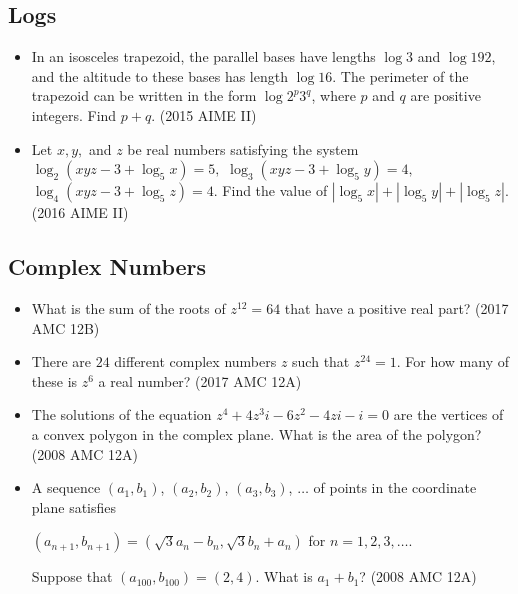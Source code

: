 \documentclass{article}
\begin{document}
\subsection{Logs}

\begin{itemize}

\item In an isosceles trapezoid, the parallel bases have lengths $\log 3$ and $\log 192$, and the altitude to these bases has length $\log 16$. The perimeter of the trapezoid can be written in the form $\log 2^p3^q$, where $p$ and $q$ are positive integers. Find $p+q$. (2015 AIME II)

\item Let $x,y,$ and $z$ be real numbers satisfying the system
$\log_2(xyz-3+\log_5 x)=5,$
$\log_3(xyz-3+\log_5 y)=4,$
$\log_4(xyz-3+\log_5 z)=4.$
Find the value of $|\log_5 x|+|\log_5 y|+|\log_5 z|$. (2016 AIME II)

\end{itemize}

\subsection{Complex Numbers}

\begin{itemize}

\item What is the sum of the roots of $z^{12}=64$ that have a positive real part? (2017 AMC 12B)

\item There are $24$ different complex numbers $z$ such that $z^{24}=1$. For how many of these is $z^6$ a real number? (2017 AMC 12A)

\item The solutions of the equation $z^4+4z^3i-6z^2-4zi-i=0$ are the vertices of a convex polygon in the complex plane. What is the area of the polygon? (2008 AMC 12A)


\item A sequence $(a_1,b_1)$, $(a_2,b_2)$, $(a_3,b_3)$, $\ldots$ of points in the coordinate plane satisfies

$(a_{n + 1}, b_{n + 1}) = (\sqrt {3}a_n - b_n, \sqrt {3}b_n + a_n)$  for $n = 1,2,3,\ldots$.

Suppose that $(a_{100},b_{100}) = (2,4)$.  What is $a_1 + b_1$? (2008 AMC 12A)

\end{itemize}
\end{document}
